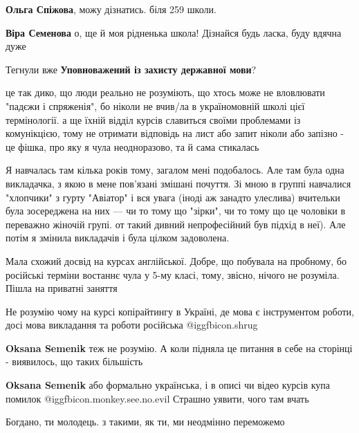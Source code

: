 \begin{itemize}
\begin{itemize}
\textbf{Ольга Спіжова}, можу дізнатись. біля 259 школи.

\textbf{Віра Семенова} о, ще й моя рідненька школа! Дізнайся будь ласка, буду вдячна дуже
\end{itemize} %

Тегнули вже \textbf{Уповноважений із захисту державної мови}?


це так дико, що люди реально не розуміють, що хтось може не вловлювати "падєжи
і спряженія", бо ніколи не вчив/ла в україномовній школі цієї термінології. а
ще їхній відділ курсів славиться своїми проблемами із комунікцією, тому не
отримати відповідь на лист або запит ніколи або запізно - це фішка, про яку я
чула неодноразово, та й сама стикалась


Я навчалась там кілька років тому, загалом мені подобалось. Але там була одна
викладачка, з якою в мене пов'язані змішані почуття. Зі мною в группі навчалися
"хлопчики" з гурту "Авіатор" і вся увага (іноді аж занадто улеслива) вчительки
була зосереджена на них — чи то тому що "зірки", чи то тому що це чоловіки в
переважно жіночій групі. от такий дивний непрофесійний був підхід в неї). Але
потім я змінила викладачів і була цілком задоволена.


Мала схожий досвід на курсах англійської. Добре, що побувала на пробному, бо
російські терміни востаннє чула у 5-му класі, тому, звісно, нічого не розуміла.
Пішла на приватні заняття



Не розумію чому на курсі копірайтингу в Україні, де мова є інструментом роботи,
досі мова викладання та роботи російська  @igg{fbicon.shrug} 

\begin{itemize} %
\textbf{Oksana Semenik} теж не розумію. А коли підняла це питання в себе на сторінці - виявилось, що таких більшість

\textbf{Oksana Semenik} або формально українська, і в описі чи відео курсів купа помилок  @igg{fbicon.monkey.see.no.evil}  Страшно уявити, чого там вчать
\end{itemize} %

Богдано, ти молодець. з такими, як ти, ми неодмінно переможемо


\end{itemize}
